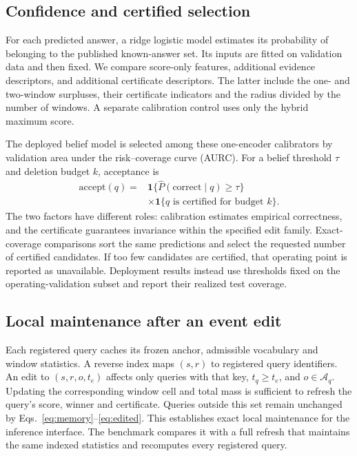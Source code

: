 \subsection{Confidence and certified selection}
For each predicted answer, a ridge logistic model estimates its probability of belonging to the published known-answer set. Its inputs are fitted on validation data and then fixed. We compare score-only features, additional evidence descriptors, and additional certificate descriptors. The latter include the one- and two-window surpluses, their certificate indicators and the radius divided by the number of windows. A separate calibration control uses only the hybrid maximum score.

The deployed belief model is selected among these one-encoder calibrators by validation area under the risk--coverage curve (AURC). For a belief threshold $\tau$ and deletion budget $k$, acceptance is
\begin{equation}
\begin{aligned}
\mathrm{accept}(q)={}&\mathbf 1\{\widehat P(\mathrm{correct}\mid q)\ge\tau\}\\
&\times\mathbf 1\{q\text{ is certified for budget }k\}.
\end{aligned}
\label{eq:accept}
\end{equation}
The two factors have different roles: calibration estimates empirical correctness, and the certificate guarantees invariance within the specified edit family. Exact-coverage comparisons sort the same predictions and select the requested number of certified candidates. If too few candidates are certified, that operating point is reported as unavailable. Deployment results instead use thresholds fixed on the operating-validation subset and report their realized test coverage.

\subsection{Local maintenance after an event edit}
Each registered query caches its frozen anchor, admissible vocabulary and window statistics. A reverse index maps $(s,r)$ to registered query identifiers. An edit to $(s,r,o,t_e)$ affects only queries with that key, $t_q\ge t_e$, and $o\in\mathcal A_q$. Updating the corresponding window cell and total mass is sufficient to refresh the query's score, winner and certificate. Queries outside this set remain unchanged by Eqs.~\eqref{eq:memory}--\eqref{eq:edited}. This establishes exact local maintenance for the inference interface. The benchmark compares it with a full refresh that maintains the same indexed statistics and recomputes every registered query.

